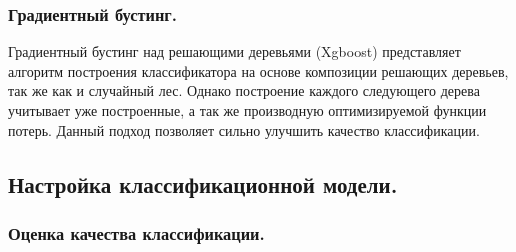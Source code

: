 \documentclass[14pt]{extarticle}
\begin{document}
\subsubsection{Градиентный бустинг.}

\par
Градиентный бустинг над решающими деревьями (Xgboost) 
\cite{xgboost} представляет алгоритм построения
классификатора на основе композиции решающих деревьев, так же как и случайный лес. 
Однако построение каждого следующего дерева учитывает уже построенные, а так же производную
оптимизируемой функции потерь. Данный подход позволяет сильно улучшить качество классификации.

\subsection{Настройка классификационной модели.}

\subsubsection{Оценка качества классификации.}
\end{document}
